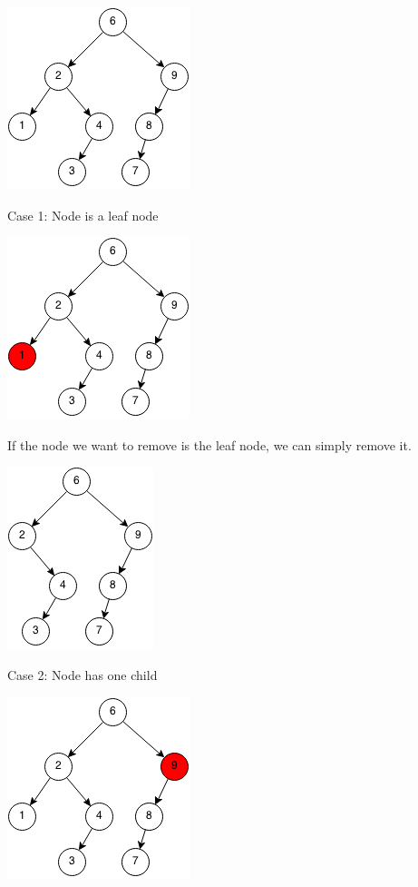 \documentclass[11pt,oneside]{book}
\makeatletter
\def\maxwidth#1{\ifdim\Gin@nat@width>#1 #1\else\Gin@nat@width\fi}
\makeatother
\begin{document}
\includegraphics[width=\maxwidth{\textwidth}]{bst-rem.png}

Case 1: Node is a leaf node

\includegraphics[width=\maxwidth{\textwidth}]{bst-rem-case11.png}

If the node we want to remove is the leaf node, we can simply remove it.

\includegraphics[width=\maxwidth{\textwidth}]{bst-rem-case12.png}

Case 2: Node has one child

\includegraphics[width=\maxwidth{\textwidth}]{bst-rem-case21.png}
\end{document}
